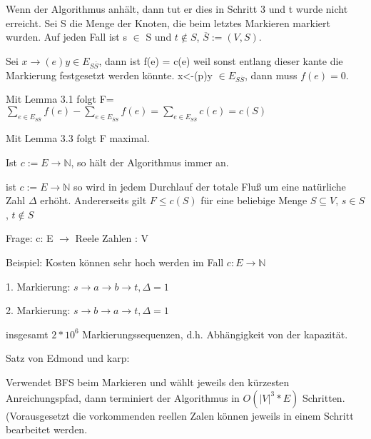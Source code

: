 \begin{beweis}
Wenn der Algorithmus anhält, dann tut er dies in Schritt 3 und t wurde nicht erreicht.  Sei S die Menge der Knoten, die beim letztes Markieren markiert wurden.  Auf jeden Fall ist s $\in$ S und $t \notin S$, $\overline{S} := (V,S)$.

Sei $x \rightarrow (e)y \in E_{S\overline{S}}$, dann ist f(e) = c(e) weil sonst entlang dieser kante die Markierung festgesetzt werden könnte.  x<-(p)y $\in E_{S\overline{S}}$, dann muss $f(e)=0$.  

Mit Lemma 3.1 folgt F=$\sum_{e \in E_{S\overline{S}}} f(e) - \sum_{e \in E_{\overline{S}S}} f(e) =
\sum_{e \in E_{S\overline{S}}} c(e) = c(S)$

Mit Lemma 3.3 folgt F maximal.
\end{beweis}

\begin{lemma}
Ist $c:= E \rightarrow \mathbb{N} $, so hält der Algorithmus immer an.
\end{lemma}

\begin{beweis}
ist $c:= E \rightarrow \mathbb{N} $ so wird in jedem Durchlauf der totale Fluß um eine natürliche Zahl $\Delta$ erhöht.  Andererseits gilt $F \leq c(S)$ für eine beliebige Menge $S \subseteq V$, $s \in S$, $t \notin S$
\end{beweis}

\begin{beispiel}
Frage: c: E $\rightarrow$ Reele Zahlen : V

Beispiel: Kosten können sehr hoch werden im Fall $c:E \rightarrow \mathbb{N} $

1. Markierung: $ s \rightarrow a \rightarrow b \rightarrow t, \Delta = 1$

2. Markierung: $ s \rightarrow b \rightarrow a \rightarrow t, \Delta = 1$

insgesamt $2*10^6$ Markierungssequenzen, d.h. Abhängigkeit von der kapazität.
\end{beispiel}

\begin{definition}
Satz von Edmond und karp:

Verwendet BFS beim Markieren und wählt jeweils den kürzesten Anreichungspfad, dann terminiert der Algorithmus in $O(|V|^3*E)$ Schritten. (Vorausgesetzt die vorkommenden reellen Zalen können jeweils in einem Schritt bearbeitet werden.

\end{definition}

